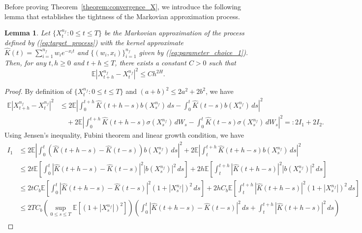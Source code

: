 \documentclass[11pt]{article}%
\newtheorem{lemma}{Lemma}
\theoremstyle{definition}
\begin{document}
Before proving Theorem~\ref{theorem:convergence_X}, we introduce the following lemma that establishes the tightness of the Markovian approximation process.
\begin{lemma}\label{lemma:tightness_markov_approx}
Let \(\{X_t^{n_f}: 0 \le t \le T\}\) be the Markovian approximation of the process defined by (\ref{eq:target_process}) with the kernel approximate \(\widehat{K}(t) = \sum_{i=1}^{n_f}w_i e^{-x_i t}\) and \(\{(w_i,x_i)\}_{i=1}^{n_f}\) given by (\ref{eq:parameter_choice_1}). Then, for any \(t,h\ge 0\) and \(t + h \le T\), there exists a constant \(C>0\) such that
\[
\mathbb{E} |X_{t+h}^{n_f} - X_t^{n_f}|^2 \le C h^{2H}.
\]
\end{lemma}

\begin{proof}
    By definition of \(\{X_t^{n_f}: 0 \le t \le T\}\) and \((a+b)^2\le 2a^2+2b^2\), we have
    \begin{align*}
        \mathbb{E} |X_{t+h}^{n_f} - X_t^{n_f}|^2 &\le 2\mathbb{E} \left|\int_{0}^{t+h} \widehat{K}(t+h-s) b(X_s^{n_f})\,ds - \int_{0}^{t}\widehat{K}(t-s) b(X_s^{n_f})\,ds\right|^2\nonumber\\
        &\quad + 2\mathbb{E} \left|\int_{0}^{t+h} \widehat{K}(t+h-s) \sigma(X_s^{n_f})\,dW_s - \int_{0}^{t}\widehat{K}(t-s) \sigma(X_s^{n_f})\,dW_s\right|^2=: 2I_1 + 2I_2.
    \end{align*}
    Using Jensen's inequality, Fubini theorem and linear growth condition, we have 
    \begin{align*}
        I_1 &\le 2\mathbb{E}\left|\int_{0}^{t} (\widehat{K}(t+h-s)-\widehat{K}(t-s))b(X_s^{n_f})\,ds\right|^2 + 2\mathbb{E}\left|\int_{t}^{t+h} \widehat{K}(t+h-s)b(X_s^{n_f})\,ds\right|^2\\
        &\le 2t \mathbb{E}\left[\int_{0}^{t} |\widehat{K}(t+h-s)-\widehat{K}(t-s)|^2 |b(X_s^{n_f})|^2\,ds\right] + 2h \mathbb{E}\left[\int_{t}^{t+h} |\widehat{K}(t+h-s)|^2 |b(X_s^{n_f})|^2\,ds\right]\\
        &\le 2t C_b \mathbb{E}\left[\int_{0}^{t} |\widehat{K}(t+h-s)-\widehat{K}(t-s)|^2 (1+|X_s^{n_f}|)^2\,ds\right] + 2h C_b \mathbb{E}\left[\int_{t}^{t+h} |\widehat{K}(t+h-s)|^2 (1+|X_s^{n_f}|)^2\,ds\right]\\
        &\le 2TC_b \left(\sup_{0\le s \le T}  \mathbb{E} [(1+|X_s^{n_f}|)^2] \right) \left(\int_{0}^{t} |\widehat{K}(t+h-s)-\widehat{K}(t-s)|^2\,ds + \int_{t}^{t+h} |\widehat{K}(t+h-s)|^2\,ds \right)\\

\end{align*}
\end{proof}
\end{document}
